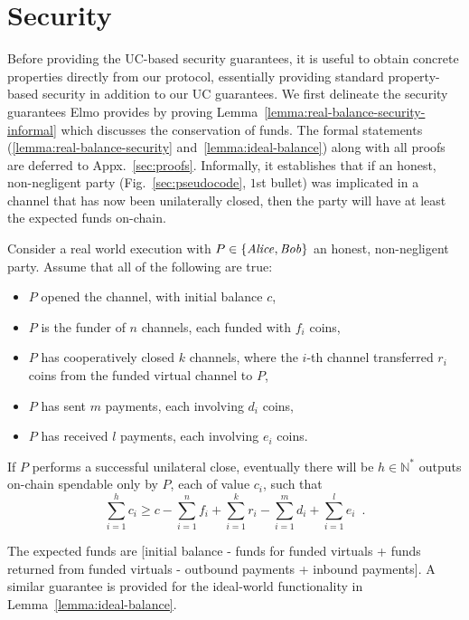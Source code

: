 \section{Security}
  \label{section:security}
    Before providing the UC-based security guarantees, it is useful to obtain
  concrete properties directly from our protocol, essentially providing standard
  property-based security in addition to our UC guarantees. We first delineate the
  security guarantees Elmo provides by proving
  Lemma~\ref{lemma:real-balance-security-informal} which discusses the
  conservation of funds. The formal statements
  (\ref{lemma:real-balance-security} and~\ref{lemma:ideal-balance})
  along with all proofs are deferred
  to Appx.~\ref{sec:proofs}.
  Informally, it
  establishes that if an
  honest, non-negligent party (Fig.~\ref{sec:pseudocode}, $1$st bullet)
  was implicated in a channel
  that has now been unilaterally closed,
  then the party will have at least the expected funds on-chain.

\begin{lemma}
\label{lemma:real-balance-security-informal}
  Consider a real world execution with $P \in \{\mathit{Alice}, \mathit{Bob}\}$ an honest,
  non-negligent party. Assume that all of the following are true:
  \begin{itemize}
    \item $P$ opened the channel, with initial balance $c$,
    \item $P$ is the funder of $n$ channels, each funded with $f_i$ coins,
    \item $P$ has cooperatively closed $k$ channels, where the $i$-th channel
    transferred $r_i$ coins from the funded virtual channel to $P$,
    \item $P$ has sent $m$ payments, each involving $d_i$ coins,
    \item $P$ has received $l$ payments, each involving $e_i$ coins.
  \end{itemize}
  If $P$ performs a successful unilateral close, eventually there will be $h \in \mathbb{N}^*$ outputs on-chain
  spendable only by $P$, each of value $c_i$, such that
  \begin{equation}
    \sum\limits_{i=1}^h c_i \geq c - \sum\limits_{i=1}^n f_i +
    \sum\limits_{i=1}^k r_i - \sum\limits_{i=1}^m d_i + \sum\limits_{i=1}^l e_i
    \enspace.
  \end{equation}
\end{lemma}

  The expected funds are [initial balance - funds for funded
  virtuals + funds returned from funded virtuals - outbound payments + inbound
  payments]. A
  similar guarantee is provided for the ideal-world functionality
  \fchan in Lemma~\ref{lemma:ideal-balance}.


